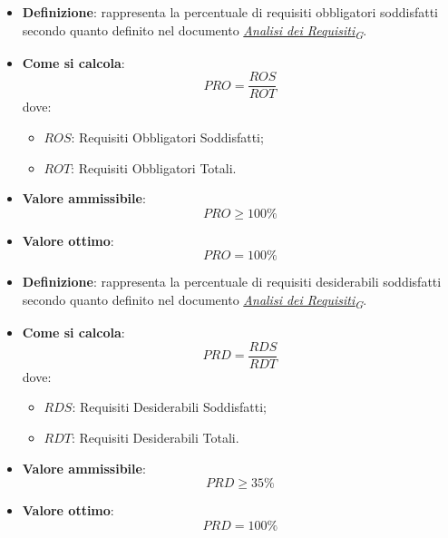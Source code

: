 \hypertarget{11M}{}
\begin{itemize}
	\item \textbf{Definizione}: rappresenta la percentuale di requisiti obbligatori soddisfatti secondo quanto definito nel documento \href{https://7last.github.io/docs/rtb/documentazione-interna/glossario\#analisi-dei-requisiti}{\textit{Analisi dei Requisiti\textsubscript{G}}}.
	\item \textbf{Come si calcola}: \begin{equation*}PRO = \frac{ROS}{ROT}\end{equation*} dove:
		\begin{itemize}
			\item $ROS$: Requisiti Obbligatori Soddisfatti;
			\item $ROT$: Requisiti Obbligatori Totali.
		\end{itemize}
	\item \textbf{Valore ammissibile}: \begin{equation*}PRO \geq 100\%\end{equation*}
	\item \textbf{Valore ottimo}: \begin{equation*}PRO = 100\%\end{equation*}
\end{itemize}

\hypertarget{12M}{}
\begin{itemize}
	\item \textbf{Definizione}: rappresenta la percentuale di requisiti desiderabili soddisfatti secondo quanto definito nel documento \href{https://7last.github.io/docs/rtb/documentazione-interna/glossario\#analisi-dei-requisiti}{\textit{Analisi dei Requisiti\textsubscript{G}}}.
	\item \textbf{Come si calcola}: \begin{equation*}PRD = \frac{RDS}{RDT}\end{equation*} dove:
		\begin{itemize}
			\item $RDS$: Requisiti Desiderabili Soddisfatti;
			\item $RDT$: Requisiti Desiderabili Totali.
		\end{itemize}
	\item \textbf{Valore ammissibile}: \begin{equation*}PRD \geq 35\%\end{equation*}
	\item \textbf{Valore ottimo}: \begin{equation*}PRD = 100\%\end{equation*}
\end{itemize}

